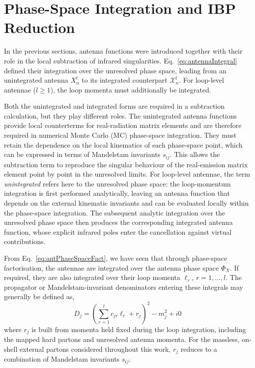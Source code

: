 \section{Phase-Space Integration and IBP Reduction}\label{sec:integration}

In the previous sections, antenna functions were introduced together with their role
in the local subtraction of infrared singularities. Eq.~\eqref{eq:antennaIntegral} defined
their integration over the unresolved phase space, leading from an unintegrated antenna
$X_n^l$ to its integrated counterpart $\mathcal X_n^l$. For loop-level antennae ($l\geq1$),
the loop momenta must additionally be integrated.

Both the unintegrated and integrated forms are required in a subtraction calculation,
but they play different roles. The unintegrated antenna functions provide local
counterterms for real-radiation matrix elements and are therefore required in numerical
Monte Carlo (MC) phase-space integration. They must retain the dependence on the local
kinematics of each phase-space point, which can be expressed in terms of Mandelstam
invariants $s_{ij}$. This allows the subtraction term to reproduce the singular
behaviour of the real-emission matrix element point by point in the unresolved limits.
For loop-level antennae, the term \textit{unintegrated} refers here to the unresolved
phase space: the loop-momentum integration is first performed analytically, leaving an
antenna function that depends on the external kinematic invariants and can be evaluated
locally within the phase-space integration. The subsequent analytic integration over the
unresolved phase space then produces the corresponding integrated antenna function,
whose explicit infrared poles enter the cancellation against virtual contributions.

From Eq.~\eqref{eq:antPhaseSpaceFact}, we have seen that through phase-space
factorisation, the antennae are integrated over the antenna phase space $\Phi_{X}$.
If required, they are also integrated over their loop momenta $\ell_r$, $r=1,...,l$.
The propagator or Mandelstam-invariant denominators entering these integrals may
generally be defined as,
\begin{equation}\label{eq:denomDef}
    D_j = \left(\sum_{r=1}^l c_{jr}\ell_r+r_j\right)^2-m_j^2+i0
\end{equation}
where $r_j$ is built from momenta held fixed during the loop integration, including
the mapped hard partons and unresolved antenna momenta. For the massless, on-shell
external partons considered throughout this work, $r_j$ reduces to a
combination of Mandelstam invariants $s_{ij}$.

